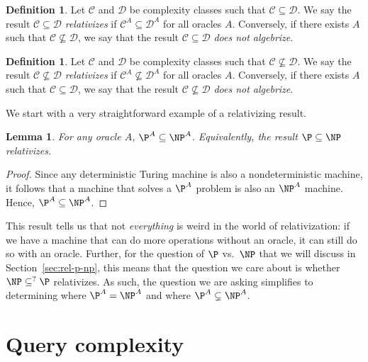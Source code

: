 \documentclass{reedthesis}
\theoremstyle{plain}
\newtheorem{lemma}[thm]{Lemma}
\theoremstyle{definition}
\newtheorem{defn}[thm]{Definition}
\theoremstyle{remark}
\numberwithin{equation}{section}
\begin{document}
\begin{defn}\label{def:relativization}
  Let $\mathcal{C}$ and $\mathcal{D}$ be complexity classes such that $\mathcal{C} \subseteq \mathcal{D}$. We say the result
  $\mathcal{C} \subseteq \mathcal{D}$ \emph{relativizes} if $\mathcal{C}^{A} \subseteq \mathcal{D}^{A}$ for all oracles $A$. Conversely,
  if there exists $A$ such that $\mathcal{C} \nsubseteq \mathcal{D}$, we say that the result $\mathcal{C} \subseteq \mathcal{D}$
  \emph{does not algebrize}.
\end{defn}

\begin{defn}\label{def:relativization-ne}
  Let $\mathcal{C}$ and $\mathcal{D}$ be complexity classes such that $\mathcal{C} \nsubseteq \mathcal{D}$. We say the result
  $\mathcal{C} \nsubseteq \mathcal{D}$ \emph{relativizes} if $\mathcal{C}^{A} \nsubseteq \mathcal{D}^{A}$ for all oracles $A$. Conversely,
  if there exists $A$ such that $\mathcal{C} \subseteq \mathcal{D}$, we say that the result $\mathcal{C} \nsubseteq \mathcal{D}$
  \emph{does not algebrize}.
\end{defn}

We start with a very straightforward example of a relativizing result.

\begin{lemma}\label{lem:pa-subset-npa}
  For any oracle $A$, $\P^{A} \subseteq \NP^{A}$. Equivalently, the result $\P \subseteq \NP$
  relativizes.
\end{lemma}

\begin{proof}
  Since any deterministic Turing machine is also a nondeterministic machine, it
  follows that a machine that solves a $\P^{A}$ problem is also an $\NP^{A}$
  machine. Hence, $\P^{A} \subseteq \NP^{A}$.
\end{proof}

This result tells us that not \emph{everything} is weird in the world of
relativization: if we have a machine that can do more operations without an
oracle, it can still do so with an oracle. Further, for the question of $\P$
vs.\ $\NP$ that we will discuss in Section~\ref{sec:rel-p-np}, this means that
the question we care about is whether $\NP \subseteq^{?} \P$ relativizes. As such, the
question we are asking simplifies to determining where $\P^{A} = \NP^{A}$ and
where $\P^{A} \subsetneq \NP^{A}$.

\section{Query complexity}\label{sec:query-complexity}
\end{document}
